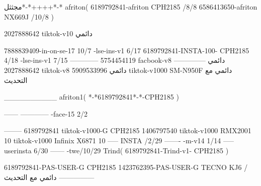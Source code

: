 مجثثل*-*++++*-*
afriton(
6189792841-afriton CPH2185  /8/8
6586413650-afriton NX669J  /10/8
)

2027888642 tiktok-v10
دائمي

7888839409-in-on-se-17 10/7
-lse-ins-v1 6/17
6189792841-INSTA-100- CPH2185 4/18
-lse-ins-v1 7/15
------------
5754454119 facbook-v8
دائمي
--------------
2027888642 tiktok-v8
دائمي
5909533996 tiktok-v1000  SM-N950F
دائمي مع التحديث

__________
afriton1(
*-*6189792841*-*-CPH2185
)


------
------------
-face-15 2/2

--------
6189792841 tiktok-v1000-G CPH2185 
1406797540 tiktok-v1000  RMX2001 10 tiktok-v1000  Infinix X6871 10\9
-----
 INSTA /2/29
-------
-m-v14 1/14
-----
userinsta 6/30
------
-twe/10/29
Trind(
6189792841-Trind-v1- CPH2185 
)


6189792841-PAS-USER-G CPH2185 
1423762395-PAS-USER-G TECNO KJ6  /دائمي مع التحديث
    ---------------

